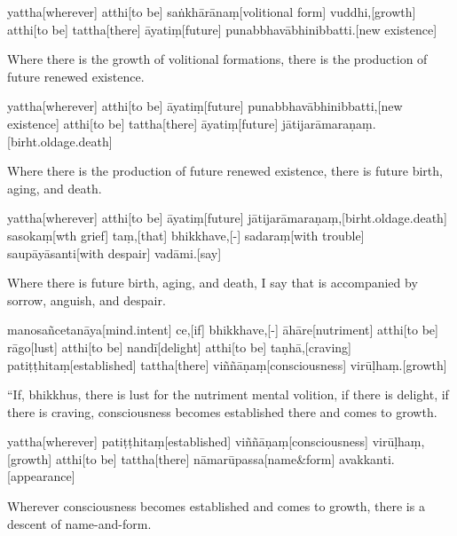 \begin{samepage}
\begingl[glneveryline={\PaliGlossA,\PaliGlossB}]
yattha[wherever] atthi[to be] saṅkhārānaṃ[volitional form] vuddhi,[growth] atthi[to be] tattha[there] āyatiṃ[future] punabbhavābhinibbatti.[new existence]
\endgl
\nopagebreak
\linespread{0.5}
\begin{spacin}{0.2}
{\PaliGlossFT Where there is the growth of volitional formations, there is the production of future renewed existence.}
\end{spacin}
\vskip 12pt
\end{samepage}
\begin{samepage}
\begingl[glneveryline={\PaliGlossA,\PaliGlossB}]
yattha[wherever] atthi[to be] āyatiṃ[future] punabbhavābhinibbatti,[new existence] atthi[to be] tattha[there] āyatiṃ[future] jātijarāmaraṇaṃ.[birht.oldage.death]
\endgl
\nopagebreak
\linespread{0.5}
\begin{spacin}{0.2}
{\PaliGlossFT Where there is the production of future renewed existence, there is future birth, aging, and death.}
\end{spacin}
\vskip 12pt
\end{samepage}
\begin{samepage}
\begingl[glneveryline={\PaliGlossA,\PaliGlossB}]
yattha[wherever] atthi[to be] āyatiṃ[future] jātijarāmaraṇaṃ,[birht.oldage.death] sasokaṃ[wth grief] taṃ,[that] bhikkhave,[-] sadaraṃ[with trouble] saupāyāsanti[with despair] vadāmi.[say]
\endgl
\nopagebreak
\linespread{0.5}
\begin{spacin}{0.2}
{\PaliGlossFT Where there is future birth, aging, and death, I say that is accompanied by sorrow, anguish, and despair.}
\end{spacin}
\vskip 12pt
\end{samepage}
\vskip 0.2in
\begin{samepage}
\begingl[glneveryline={\PaliGlossA,\PaliGlossB}]
manosañcetanāya[mind.intent] ce,[if] bhikkhave,[-] āhāre[nutriment] atthi[to be] rāgo[lust] atthi[to be] nandī[delight] atthi[to be] taṇhā,[craving] patiṭṭhitaṃ[established] tattha[there] viññāṇaṃ[consciousness] virūḷhaṃ.[growth]
\endgl
\nopagebreak
\linespread{0.5}
\begin{spacin}{0.2}
{\PaliGlossFT “If, bhikkhus, there is lust for the nutriment mental volition, if there is delight, if there is craving, consciousness becomes established there and comes to growth.}
\end{spacin}
\vskip 12pt
\end{samepage}
\begin{samepage}
\begingl[glneveryline={\PaliGlossA,\PaliGlossB}]
yattha[wherever] patiṭṭhitaṃ[established] viññāṇaṃ[consciousness] virūḷhaṃ,[growth] atthi[to be] tattha[there] nāmarūpassa[name\&form] avakkanti.[appearance]
\endgl
\nopagebreak
\linespread{0.5}
\begin{spacin}{0.2}
{\PaliGlossFT Wherever consciousness becomes established and comes to growth, there is a descent of name-and-form.}
\end{spacin}
\vskip 12pt
\end{samepage}
